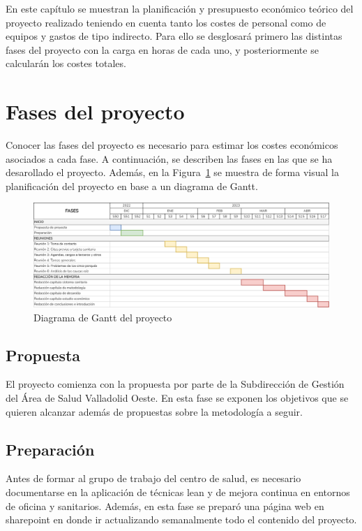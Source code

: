 En este capítulo se muestran la planificación y presupuesto económico teórico del proyecto realizado teniendo en cuenta tanto los costes de personal como de equipos y gastos de tipo indirecto. Para ello se desglosará primero las distintas fases del proyecto con la carga en horas de cada uno, y posteriormente se calcularán los costes totales.

\section{Fases del proyecto}

Conocer las fases del proyecto es necesario para estimar los costes económicos asociados a cada fase.
A continuación, se describen las fases en las que se ha desarollado el proyecto.
Además, en la Figura~\ref{fig:gantt} se muestra de forma visual la planificación del proyecto en base a un diagrama de Gantt.

\begin{figure}[H]
    \centering
    \includegraphics[width=\textwidth]{img/gantt-diagram.png}
    \caption{Diagrama de Gantt del proyecto}
    \label{fig:gantt}
\end{figure}

\subsection{Propuesta}

El proyecto comienza con la propuesta por parte de la Subdirección de Gestión del Área de Salud Valladolid Oeste. En esta fase se exponen los objetivos que se quieren alcanzar además de propuestas sobre la metodología a seguir.

\subsection{Preparación}

Antes de formar al grupo de trabajo del centro de salud, es necesario documentarse en la aplicación de técnicas lean y de mejora continua en entornos de oficina y sanitarios. Además, en esta fase se preparó una página web en \Gls{sharepoint} en donde ir actualizando semanalmente todo el contenido del proyecto.

